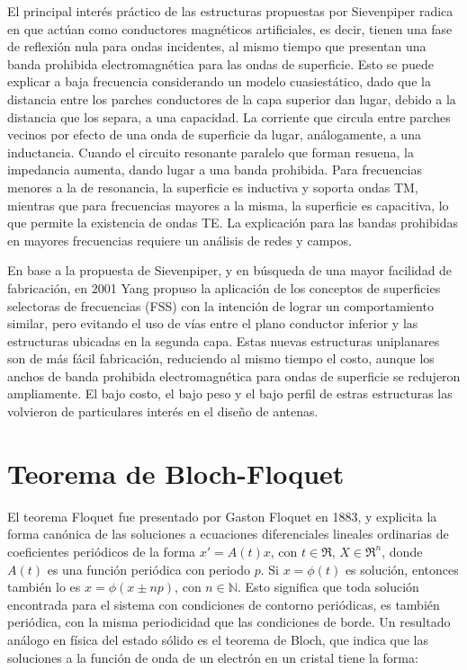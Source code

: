 El principal interés práctico de las estructuras propuestas por Sievenpiper radica en que actúan como conductores magnéticos artificiales, es decir, tienen una fase de reflexión nula para ondas incidentes, al mismo tiempo que presentan una banda prohibida electromagnética para las ondas de superficie. Esto se puede explicar a baja frecuencia considerando un modelo cuasiestático, dado que la distancia entre los parches conductores de la capa superior dan lugar, debido a la distancia que los separa, a una capacidad. La corriente que circula entre parches vecinos por efecto de una onda de superficie da lugar, análogamente, a una inductancia. Cuando el circuito resonante paralelo que forman resuena, la impedancia aumenta, dando lugar a una banda prohibida. Para frecuencias menores a la de resonancia, la superficie es inductiva y soporta ondas TM, mientras que para frecuencias mayores a la misma, la superficie es capacitiva, lo que permite la existencia de ondas TE. La explicación para las bandas prohibidas en mayores frecuencias requiere un análisis de redes y campos.

En base a la propuesta de Sievenpiper, y en búsqueda de una mayor facilidad de fabricación, en 2001 Yang propuso la aplicación de los conceptos de superficies selectoras de frecuencias (FSS) con la intención de lograr un comportamiento similar, pero evitando el uso de vías entre el plano conductor inferior y las estructuras ubicadas en la segunda capa. Estas nuevas estructuras uniplanares son de más fácil fabricación, reduciendo al mismo tiempo el costo, aunque los anchos de banda prohibida electromagnética para ondas de superficie se redujeron ampliamente. El bajo costo, el bajo peso y el bajo perfil de estras estructuras las volvieron de particulares interés en el diseño de antenas.




\section{Teorema de Bloch-Floquet}

El teorema Floquet fue presentado por Gaston Floquet en 1883, y explicita la forma canónica de las soluciones a ecuaciones diferenciales lineales ordinarias de coeficientes periódicos de la forma $x' = A(t)x$, con $t \in \Re$, $X \in \Re^n$, donde $A(t)$ es una función periódica con periodo $p$. Si $x=\phi(t)$ es solución, entonces también lo es $x=\phi(x\pm np)$, con $n \in \mathbb{N}$. Esto significa que toda solución encontrada para el sistema con condiciones de contorno periódicas, es también periódica, con la misma periodicidad que las condiciones de borde. Un resultado análogo en física del estado sólido es el teorema de Bloch, que indica que las soluciones a la función de onda de un electrón en un cristal tiene la forma:

